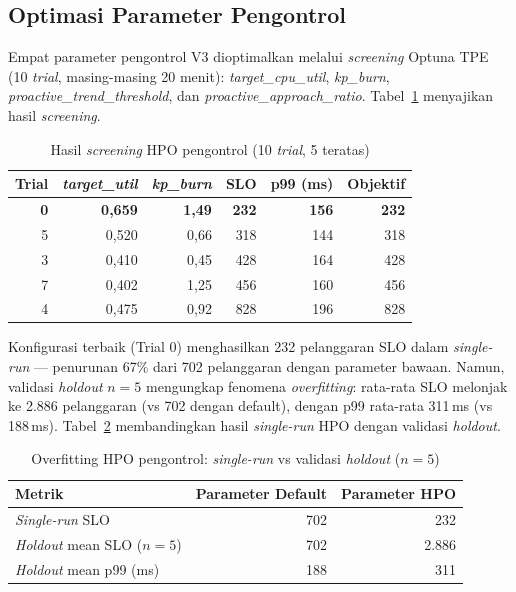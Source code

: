 \subsection{Optimasi Parameter Pengontrol}
\label{sec:controller-hpo}

Empat parameter pengontrol V3 dioptimalkan melalui \emph{screening} Optuna TPE (10 \emph{trial}, masing-masing 20 menit): \emph{target\_cpu\_util}, \emph{kp\_burn}, \emph{proactive\_trend\_threshold}, dan \emph{proactive\_approach\_ratio}. Tabel~\ref{tab:controller-hpo} menyajikan hasil \emph{screening}.

\begin{table}[htbp]
    \centering
    \caption{Hasil \emph{screening} HPO pengontrol (10 \emph{trial}, 5 teratas)}
    \label{tab:controller-hpo}
    \begin{tabular}{rrrrrr}
        \toprule
        Trial & \emph{target\_util} & \emph{kp\_burn} & SLO & p99 (ms) & Objektif \\
        \midrule
        \textbf{0} & \textbf{0,659} & \textbf{1,49} & \textbf{232} & \textbf{156} & \textbf{232} \\
        5 & 0,520 & 0,66 & 318 & 144 & 318 \\
        3 & 0,410 & 0,45 & 428 & 164 & 428 \\
        7 & 0,402 & 1,25 & 456 & 160 & 456 \\
        4 & 0,475 & 0,92 & 828 & 196 & 828 \\
        \bottomrule
    \end{tabular}
\end{table}

Konfigurasi terbaik (Trial 0) menghasilkan 232 pelanggaran SLO dalam \emph{single-run} — penurunan 67\% dari 702 pelanggaran dengan parameter bawaan. Namun, validasi \emph{holdout} $n=5$ mengungkap fenomena \emph{overfitting}: rata-rata SLO melonjak ke 2.886 pelanggaran (vs 702 dengan default), dengan p99 rata-rata 311\,ms (vs 188\,ms). Tabel~\ref{tab:holdout-overfit} membandingkan hasil \emph{single-run} HPO dengan validasi \emph{holdout}.

\begin{table}[htbp]
    \centering
    \caption{Overfitting HPO pengontrol: \emph{single-run} vs validasi \emph{holdout} ($n=5$)}
    \label{tab:holdout-overfit}
    \begin{tabular}{lrr}
        \toprule
        Metrik & Parameter Default & Parameter HPO \\
        \midrule
        \emph{Single-run} SLO & 702 & 232 \\
        \emph{Holdout} mean SLO ($n=5$) & 702 & 2.886 \\
        \emph{Holdout} mean p99 (ms) & 188 & 311 \\
        \bottomrule
    \end{tabular}
\end{table}

